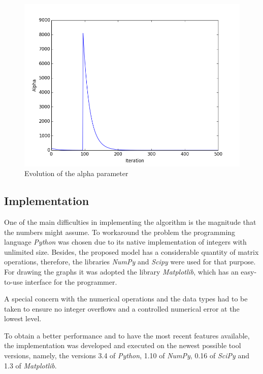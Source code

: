 \documentclass[tuberlin,cic,tc,openright,english,noabntcite,oneside]{iiufrgs}
\begin{document}
\begin{figure}[H]
	\centering
    \caption{Evolution of the alpha parameter}
    \includegraphics[width=\textwidth]{fig_alpha_evolution}\par
    \label{fig:alpha_evolution}
\end{figure}

\subsection{Implementation}
One of the main difficulties in implementing the algorithm is the magnitude that the numbers might assume. To workaround the problem the programming language \emph{Python} was chosen due to its native implementation of integers with unlimited size. Besides, the proposed model has a considerable quantity of matrix operations, therefore, the libraries \emph{NumPy} and \emph{Scipy} were used for that purpose. For drawing the graphs it was adopted the library \emph{Matplotlib}, which has an easy-to-use interface for the programmer.

A special concern with the numerical operations and the data types had to be taken to ensure no integer overflows and a controlled numerical error at the lowest level.

To obtain a better performance and to have the most recent features available, the implementation was developed and executed on the newest possible tool versions, namely, the versions 3.4 of \emph{Python}, 1.10 of \emph{NumPy}, 0.16 of \emph{SciPy} and 1.3 of \emph{Matplotlib}.
\end{document}
